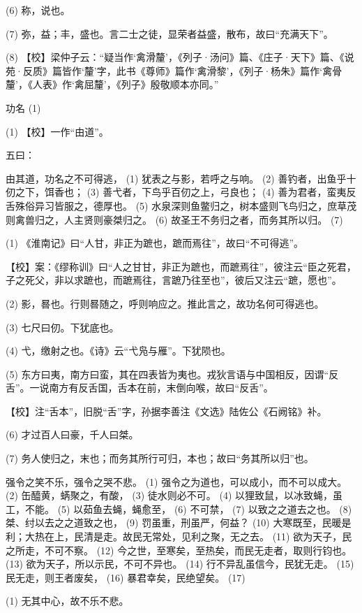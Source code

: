 \documentclass[12pt,UTF8]{ctexbook}
\begin{document}
(6) 称，说也。

(7) 弥，益；丰，盛也。言二士之徒，显荣者益盛，散布，故曰“充满天下”。

(8) 【校】梁仲子云：“疑当作‘禽滑釐’，《列子·汤问》篇、《庄子·天下》篇、《说苑·反质》篇皆作‘釐’字，此书《尊师》篇作‘禽滑黎’，《列子·杨朱》篇作‘禽骨釐’，《人表》作‘禽屈釐’，《列子》殷敬顺本亦同。”





功名 (1)


(1) 【校】一作“由道”。

五曰：

由其道，功名之不可得逃， (1) 犹表之与影，若呼之与响。 (2) 善钓者，出鱼乎十仞之下，饵香也； (3) 善弋者，下鸟乎百仞之上，弓良也； (4) 善为君者，蛮夷反舌殊俗异习皆服之，德厚也。 (5) 水泉深则鱼鳖归之，树本盛则飞鸟归之，庶草茂则禽兽归之，人主贤则豪桀归之。 (6) 故圣王不务归之者，而务其所以归。 (7)

(1) 《淮南记》曰“人甘，非正为蹠也，蹠而焉往”，故曰“不可得逃”。

【校】案：《缪称训》曰“人之甘甘，非正为蹠也，而蹠焉往”，彼注云“臣之死君，子之死父，非以求蹠也，而蹠焉往，言蹠乃往至也”，彼后又注云“蹠，愿也”。

(2) 影，晷也。行则晷随之，呼则响应之。推此言之，故功名何可得逃也。

(3) 七尺曰仞。下犹底也。

(4) 弋，缴射之也。《诗》云“弋凫与雁”。下犹陨也。

(5) 东方曰夷，南方曰蛮，其在四表皆为夷也。戎狄言语与中国相反，因谓“反舌”。一说南方有反舌国，舌本在前，末倒向喉，故曰“反舌”。

【校】注“舌本”，旧脱“舌”字，孙据李善注《文选》陆佐公《石阙铭》补。

(6) 才过百人曰豪，千人曰桀。

(7) 务人使归之，末也；而务其所行可归，本也；故曰“务其所以归”也。

强令之笑不乐，强令之哭不悲。 (1) 强令之为道也，可以成小，而不可以成大。 (2) 缶醯黄，蜹聚之，有酸， (3) 徒水则必不可。 (4) 以狸致鼠，以冰致蝇，虽工，不能。 (5) 以茹鱼去蝇，蝇愈至， (6) 不可禁， (7) 以致之之道去之也。 (8) 桀、纣以去之之道致之也， (9) 罚虽重，刑虽严，何益？ (10) 大寒既至，民暖是利；大热在上，民清是走。故民无常处，见利之聚，无之去。 (11) 欲为天子，民之所走，不可不察。 (12) 今之世，至寒矣，至热矣，而民无走者，取则行钧也。 (13) 欲为天子，所以示民，不可不异也。 (14) 行不异乱虽信今，民犹无走。 (15) 民无走，则王者废矣， (16) 暴君幸矣，民绝望矣。 (17)

(1) 无其中心，故不乐不悲。
\end{document}
